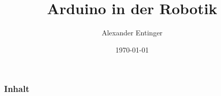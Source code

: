 \documentclass{beamer}
\title[]{Arduino in der Robotik} %
\author{Alexander Entinger} %
\institute{LXRobotics}
\date{\today} %
\begin{document}
\begin{frame}
\titlepage %
\end{frame}
\frametitle{Inhalt} %
\tableofcontents %
\end{document}
